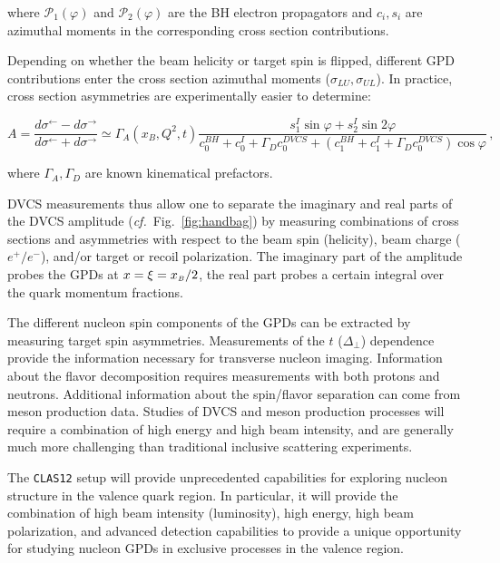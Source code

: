 \noindent 
where $\mathcal P_1(\varphi)$ and $\mathcal P_2(\varphi)$ are the BH electron 
propagators and $c_i,s_i$ are azimuthal moments in the corresponding cross 
section contributions.

Depending on whether the beam helicity or target spin is flipped, different 
GPD contributions enter the cross section azimuthal moments ($\sigma_{LU},
\sigma_{UL}$).  In practice, cross section asymmetries are experimentally 
easier to determine:

\begin{equation}
A=\frac{d\sigma^\leftarrow-d\sigma^\rightarrow}{d\sigma^\leftarrow+d\sigma^\rightarrow}\simeq\Gamma_A(x_B,Q^2,t)\frac{s_1^I \sin\varphi + s_2^I \sin 2\varphi}
{c_0^{BH}+c_0^I+\Gamma_Dc_0^{DVCS}+(c_1^{BH}+c_1^I+\Gamma_Dc_0^{DVCS})\cos\varphi} \, ,
\end{equation}

\vskip 0.3cm

\noindent 
where $\Gamma_A,\Gamma_D$ are  known kinematical prefactors. 

DVCS measurements thus allow one to separate the imaginary and real parts of 
the DVCS amplitude (\textit{cf.}\ Fig.~\ref{fig:handbag}) by measuring 
combinations of cross sections and asymmetries with respect to the beam spin 
(helicity), beam charge ($e^+/e^-$), and/or target or recoil polarization. 
The imaginary part of the amplitude probes the GPDs at $x=\xi = x_{\scriptscriptstyle B}/2$,
the real part probes a certain integral over the quark momentum fractions. 

The different nucleon spin components of the GPDs can be extracted by 
measuring target spin asymmetries. Measurements of the $t$ ($\Delta_\perp$) 
dependence provide the information necessary for transverse nucleon imaging. 
Information about the flavor decomposition requires measurements with both 
protons and neutrons.   Additional information about the spin/flavor 
separation can come from meson production data. Studies of DVCS and meson 
production processes will require a combination of high energy and high beam 
intensity, and are generally much more challenging than traditional inclusive 
scattering experiments.

The {\tt CLAS12} setup will provide unprecedented capabilities for exploring 
nucleon structure in the valence quark region. In particular, it will provide
the  combination of high beam intensity (luminosity), high energy, high beam 
polarization, and advanced detection capabilities to provide a unique 
opportunity for studying nucleon GPDs in exclusive processes in the valence 
region.

